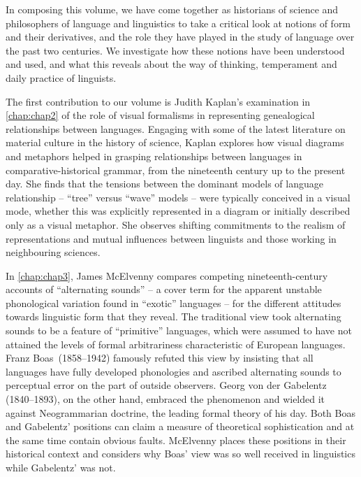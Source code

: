 \begin{refsection}
In composing this volume, we have come together as historians of science and philosophers of language and linguistics to take a critical look at notions of form and their derivatives, and the role they have played in the study of language over the past two centuries. We investigate how these notions have been understood and used, and what this reveals about the way of thinking, temperament and daily practice of linguists.

The first contribution to our volume is Judith Kaplan's examination in \ref{chap:chap2} of the role of visual formalisms in representing genealogical relationships between languages. Engaging with some of the latest literature on material culture in the history of science, Kaplan explores how visual diagrams and metaphors helped in grasping relationships between languages in comparative-historical grammar, from the nineteenth century up to the present day. She finds that the tensions between the dominant models of language relationship – ``tree'' versus ``wave'' models – were typically conceived in a visual mode, whether this was explicitly represented in a diagram or initially described only as a visual metaphor. She observes shifting commitments to the realism of representations and mutual influences between linguists and those working in neighbouring sciences.

In \ref{chap:chap3}, James McElvenny compares competing nineteenth-century accounts of ``alternating sounds'' – a cover term for the apparent unstable phonological variation found in ``exotic'' languages – for the different attitudes towards linguistic form that they reveal. The traditional view took alternating sounds to be a feature of ``primitive'' languages, which were assumed to have not attained the levels of formal arbitrariness characteristic of European languages. Franz Boas~(1858–1942) famously refuted this view by insisting that all languages have fully developed phonologies and ascribed alternating sounds to perceptual error on the part of outside observers. Georg von der Gabelentz (1840–1893), on the other hand, embraced the phenomenon and wielded it against Neogrammarian doctrine, the leading formal theory of his day. Both Boas and Gabelentz' positions can claim a measure of theoretical sophistication and at the same time contain obvious faults. McElvenny places these positions in their historical context and considers why Boas' view was so well received in linguistics while Gabelentz' was not.


\end{refsection}
